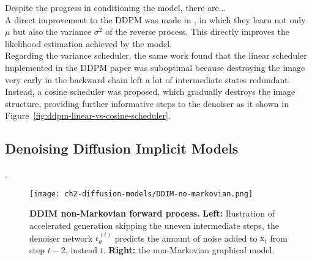 Despite the progress in conditioning the model, there are...\\

\noindent A direct improvement to the DDPM was made in \cite{nichol2021improved}, in which they learn not only $\mu$ but also the variance $\sigma^{2}$ of the reverse process. This directly improves the likelihood estimation achieved by the model. \\
\noindent Regarding the variance scheduler, the same work found that the linear scheduler implemented in the DDPM paper was suboptimal because destroying the image very early in the backward chain left a lot of intermediate states redundant. Instead, a cosine scheduler was proposed, which gradually destroys the image structure, providing further informative steps to the denoiser as it shown in Figure~\ref{fig:ddpm-linear-vs-cosine-scheduler}. \\


\subsection{Denoising Diffusion Implicit Models}\label{sec:DDIM}

. \\

\begin{figure}[t]
  \centering
  \texttt{[image: ch2-diffusion-models/DDIM-no-markovian.png]}
  \captionsetup{width=\textwidth} %
  \caption{\textbf{DDIM non-Markovian forward process.} \textbf{Left:} Ilustration of accelerated generation skipping the uneven intermediate steps, the denoiser network $\epsilon_{\theta}^{(t)}$ predicts the amount of noise added to $\mathrm{x}_{t}$ from step $t-2$, instead $t$. \textbf{Right:} the non-Markovian graphical model.}
  \label{fig:ddim-non-markovian}
\end{figure}

